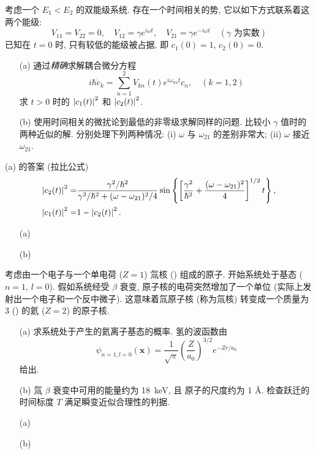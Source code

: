 \documentclass{assignment}
\begin{document}
\begin{prob}[课本习题 5.30]
    考虑一个 $E_1<E_2$ 的双能级系统. 存在一个时间相关的势, 它以如下方式联系着这两个能级:
    \[
        V_{11}=V_{22}=0,\quad V_{12}=\gamma e^{i\omega t},\quad V_{21}=\gamma e^{-i\omega t}\quad(\gamma\text{ 为实数})
    \]
    已知在 $t=0$ 时, 只有较低的能级被占据, 即 $c_1(0)=1$, $c_2(0)=0$.
    \begin{itemize}
        \item[(a)] 通过\textit{精确}求解耦合微分方程
        \[
            i\hbar\dot{c}_k=\sum_{n=1}^2V_{kn}(t)e^{i\omega_{kn}t}c_n,\quad(k=1,2)
        \]
        求 $t>0$ 时的 $\left\lvert c_1(t)\right\rvert^2$ 和 $\left\lvert c_2(t)\right\rvert^2$.
        \item[(b)] 使用时间相关的微扰论到最低的非零级求解同样的问题. 比较小 $\gamma$ 值时的两种近似的解. 分别处理下列两种情况: (i) $\omega$ 与 $\omega_{21}$ 的差别非常大; (ii) $\omega$ 接近 $\omega_{21}$.
    \end{itemize}

    (a) 的答案 (拉比公式)
    \begin{align*}
        \left\lvert c_2(t)\right\rvert^2=&\frac{\gamma^2/\hbar^2}{\gamma^2/\hbar^2+(\omega-\omega_{21})^2/4}\sin\left\{\left[\frac{\gamma^2}{\hbar^2}+\frac{(\omega-\omega_{21})^2}{4}\right]^{1/2}t\right\},\\
        \left\lvert c_1(t)\right\rvert^2=&1-\left\lvert c_2(t)\right\rvert^2.
    \end{align*}
\end{prob}
\begin{sol}
    \begin{itemize}
        \item[(a)] 
        \item[(b)] 
    \end{itemize}
\end{sol}

\begin{prob}[课本习题 5.35]
    考虑由一个电子与一个单电荷 ($Z=1$) 氚核 () 组成的原子. 开始系统处于基态 ($n=1$, $l=0$). 假如系统经受 $\beta$ 衰变, 原子核的电荷突然增加了一个单位 (实际上发射出一个电子和一个反中微子). 这意味着氚原子核 (称为氚核) 转变成一个质量为 $3$ () 的氦 ($Z=2$) 的原子核.
    \begin{itemize}
        \item[(a)] 求系统处于产生的氦离子基态的概率. 氢的波函数由
        \[
            \psi_{n=1,l=0}(\bm{x})=\frac{1}{\sqrt{\pi}}\left(\frac{Z}{a_0}\right)^{3/2}e^{-Zr/a_0}
        \]
        给出.
        \item[(b)] 氚 $\beta$ 衰变中可用的能量约为 \SI{18}{keV}, 且  原子的尺度约为 1 \AA. 检查跃迁的时间标度 $T$ 满足瞬变近似合理性的判据.
    \end{itemize}
\end{prob}
\begin{itemize}
    \item[(a)] 
    \item[(b)] 
\end{itemize}
\end{document}
